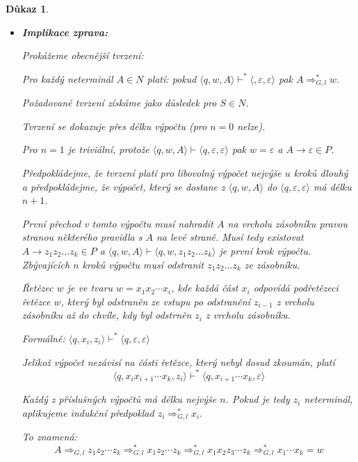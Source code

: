 \documentclass[10pt, a4paper, titlepage]{article}
\theoremstyle{note}
\newtheorem{dukaz}{\textbf{Důkaz}}
\begin{document}
\begin{dukaz}
\begin{itemize}
Zřejmě $w=y_{i+1}u_{i+1}$ kde $x_{i+1}=y_iw_iv_i=y_{i+1}z_{i+1}$.

Ve speciálním případě: $i=n$ dostáváme $\langle q,w,S \rangle \vdash^* \langle q,u_n,z_n \rangle$, kde $w=y_nu_n$, $X_n=y_nz_n=w$ tj. dle 1. vlastnosti, protože $z_n$ je celý z terminálnch symbolů, platí, že $z_n=\varepsilon$, to jest $x_n=y_nz_n=y_n=w$ ale $w=y_nu_n$, odtud $u_n=\varepsilon$.

Takže $\langle q,w,S \rangle \vdash^* \langle q,\varepsilon,\varepsilon \rangle$.

\item
\textbf{Implikace zprava:}

Prokážeme obecnější tvrzení:

Pro každý neterminál $A \in N$ platí: pokud $\langle q,w,A \rangle \vdash^* \langle,\varepsilon,\varepsilon \rangle$ pak $A \Rightarrow_{G,l}^* w$.

Požadované tvrzení získáme jako důsledek pro $S \in N$.

Tvrzení se dokazuje přes délku výpočtu (pro $n=0$ nelze).

Pro $n=1$ je triviální, protože $\langle q,w,A \rangle \vdash \langle q,\varepsilon,\varepsilon \rangle$ pak $w=\varepsilon$ a $A \rightarrow \varepsilon \in P$.

Předpokládejme, že tvrzení platí pro libovolný výpočet nejvýše $u$ kroků dlouhý a předpokládejme, že výpočet, který se dostane z $\langle q,w,A \rangle$ do $\langle q,\varepsilon,\varepsilon \rangle$ má délku $n+1$.

První přechod v tomto výpočtu musí nahradit $A$ na vrcholu zásobníku pravou stranou některého pravidla s $A$ na levé straně. Musí tedy existovat $A \rightarrow z_1z_2\ldots z_k \in P$ a $\langle q,w,A \rangle \vdash \langle q,w,z_1z_2\ldots z_k \rangle$ je první krok výpočtu. Zbývajících $n$ kroků výpočtu musí odstranit $z_1z_2\ldots z_k$ ze zásobníku.%

Řetězec $w$ je ve tvaru $w=x_1x_2\cdots x_i$, kde každá část $x_i$ odpovídá podřetězeci řetězce $w$, který byl odstraněn ze vstupu po odstranění $z_{i-1}$ z vrcholu zásobníku až do chvíle, kdy byl odstrněn $z_i$ z vrcholu zásobníku.

Formálně: $\langle q,x_i,z_i \rangle \vdash^* \langle q,\varepsilon,\varepsilon \rangle$

Jelikož výpočet nezávisí na části řetězce, který nebyl dosud zkoumán, platí
$$\langle q,x_ix_{i+1}\cdots x_k,z_i \rangle \vdash^* \langle q,x_{i+1}\cdots x_k,\varepsilon \rangle$$

Každý z příslušných výpočtů má délku nejvýše $n$. Pokud je tedy $z_i$ neterminál, aplikujeme indukční předpoklad $z_i \Rightarrow_{G,l}^* x_i$.

To znamená:
$$
A \Rightarrow_{G,l} z_1z_2\cdots z_k \Rightarrow_{G,l}^* x_1z_2\cdots z_k \Rightarrow_{G,l}^* x_1x_2z_3\cdots z_k \Rightarrow_{G,l}^* x_1 \cdots x_k = w
$$
\end{itemize}
\end{dukaz}
\end{document}
